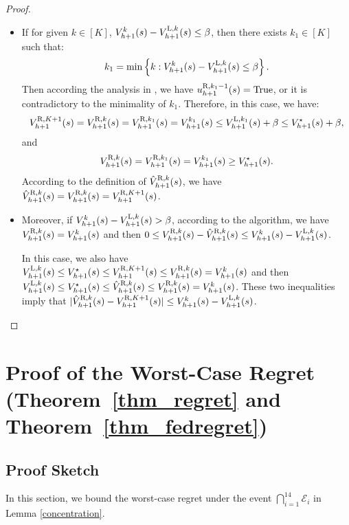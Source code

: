 \documentclass{article}
\newcommand{\LL}{\textnormal{L}}
\newcommand{\R}{\textnormal{R}}
\begin{document}
\begin{proof}
\begin{itemize}
    \item If for given $k \in [K]$, $V_{h+1}^k(s) - V_{h+1}^{\LL,k}(s) \leq \beta $, then there exists $k_1 \in [K]$ such that:
$$k_1 = \min\left\{k:V_{h+1}^k(s) - V_{h+1}^{\LL,k}(s) \leq \beta \right\}.$$
Then according the analysis in , we have $u_{h+1}^{\R,k_1-1}(s) = \textnormal{True}$, or it is contradictory to the minimality of $k_1$. Therefore, in this case, we have: 
$$V_{h+1}^{\R,K+1}(s)  = V_{h+1}^{\R,k}(s) = V_{h+1}^{\R,k_1}(s) = V_{h+1}^{k_1}(s) \leq V_{h+1}^{\LL,k_1}(s) + \beta \leq V_{h+1}^{\star}(s) + \beta,$$
and 
$$V_{h+1}^{\R,k}(s) = V_{h+1}^{\R,k_1}(s) = V_{h+1}^{k_1}(s) \geq  V_{h+1}^{\star}(s).$$
According to the definition of $\hat{V}_{h+1}^{\R,k}(s)$, we have $\hat{V}_{h+1}^{\R,k}(s) = V_{h+1}^{\R,k}(s) = V_{h+1}^{\R,K+1}(s)$. 
\item Moreover, if $V_{h+1}^k(s) - V_{h+1}^{\LL,k}(s) > \beta $, according to the algorithm, we have $V_{h+1}^{\R,k}(s) = V_{h+1}^{k}(s)$ and then $0\leq V_{{h}+1}^{\R,k}(s)-\hat{V}_{{h}+1}^{\R,k}(s) \leq V_{h+1}^{k}(s)-V_{h+1}^{\LL, k}(s)$.

In this case, we also have $V_{h+1}^{\LL,k}(s) \leq V_{h+1}^{\star}(s) \leq V_{h+1}^{\R,K+1}(s) \leq V_{h+1}^{\R,k}(s)=V_{h+1}^{k}(s)$ and then $V_{h+1}^{\LL,k}(s)\leq V_{h+1}^{\star}(s) \leq \hat{V}_{h+1}^{\R,k}(s) \leq V_{h+1}^{\R,k}(s) = V_{h+1}^{k}(s)$. These two inequalities imply that 
$|\hat{V}_{{h}+1}^{\R,k}(s)-V_{{h}+1}^{\R,K+1}(s)| \leq V_{h+1}^{k}(s)-V_{h+1}^{\LL, k}(s)$.
\end{itemize}
\end{proof} 
\section{Proof of the Worst-Case Regret \texorpdfstring{(Theorem~\ref{thm_regret} and Theorem~\ref{thm_fedregret})}{(Theorem 4.1 and Theorem 4.3)}}
\label{worstcase}
\subsection{Proof Sketch}
In this section, we bound the worst-case regret under the event $\bigcap_{i=1}^{14}\mathcal{E}_i$ in Lemma \ref{concentration}.
\end{document}
